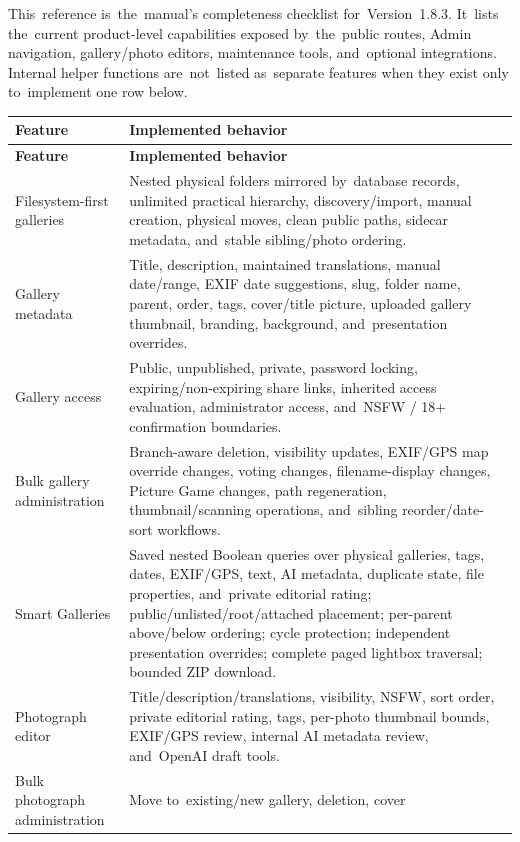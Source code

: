 \documentclass[11pt,a4paper]{article}
\newcommand{\version}{1.8.3}
\begin{document}
This~reference is~the~manual's completeness checklist for~Version~\version{}.
It~lists the~current product-level capabilities exposed by~the~public routes,
Admin navigation, gallery/photo editors, maintenance tools, and~optional
integrations. Internal helper functions are~not~listed as~separate features when
they exist only to~implement one row below.

\begin{longtable}{%
    >{\raggedright\arraybackslash}p{}%
    >{\raggedright\arraybackslash}p{}%
}
\toprule
\textbf{Feature} & \textbf{Implemented behavior}\\
\midrule
\endfirsthead
\toprule
\textbf{Feature} & \textbf{Implemented behavior}\\
\midrule
\endhead
Filesystem-first galleries & Nested physical folders mirrored by~database
records, unlimited practical hierarchy, discovery/import, manual creation,
physical moves, clean public paths, sidecar metadata, and~stable sibling/photo
ordering.\\
Gallery metadata & Title, description, maintained translations, manual
date/range, EXIF date suggestions, slug, folder name, parent, order, tags,
cover/title picture, uploaded gallery thumbnail, branding, background,
and~presentation overrides.\\
Gallery access & Public, unpublished, private, password locking,
expiring/non-expiring share links, inherited access evaluation, administrator
access, and~NSFW / 18+ confirmation boundaries.\\
Bulk gallery administration & Branch-aware deletion, visibility updates,
EXIF/GPS map override changes, voting changes, filename-display changes, Picture
Game changes, path regeneration, thumbnail/scanning operations, and~sibling
reorder/date-sort workflows.\\
Smart Galleries & Saved nested Boolean queries over physical galleries, tags,
dates, EXIF/GPS, text, AI metadata, duplicate state, file properties,
and~private editorial rating; public/unlisted/root/attached placement;
per-parent above/below ordering; cycle protection; independent presentation
overrides; complete paged lightbox traversal; bounded ZIP download.\\
Photograph editor & Title/description/translations, visibility, NSFW, sort
order, private editorial rating, tags, per-photo thumbnail bounds, EXIF/GPS
review, internal AI metadata review, and~OpenAI draft tools.\\
Bulk photograph administration & Move to~existing/new gallery, deletion, cover

\end{longtable}
\end{document}
